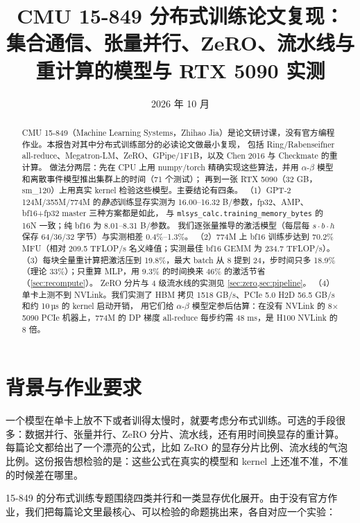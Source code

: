 \documentclass[11pt,a4paper]{ctexart}
\title{CMU 15-849 分布式训练论文复现：\\集合通信、张量并行、ZeRO、流水线与重计算的模型与 RTX 5090 实测}
\author{\authorline}
\date{2026 年 10 月}
\begin{document}
\maketitle

\begin{abstract}
CMU 15-849（Machine Learning Systems，Zhihao Jia）是论文研讨课，没有官方编程作业。本报告对其中分布式训练部分的必读论文做最小复现，
包括 Ring/Rabenseifner all-reduce、Megatron-LM、ZeRO、GPipe/1F1B，以及 Chen 2016 与 Checkmate 的重计算。
做法分两层：先在 CPU 上用 numpy/torch 精确实现这些算法，并用 $\alpha$-$\beta$ 模型和离散事件模型推出集群上的时间（71 个测试）；
再到一张 RTX 5090（32 GB，sm\_120）上用真实 kernel 检验这些模型。主要结论有四条。
（1）GPT-2 124M/355M/774M 的\emph{静态}训练显存实测为 16.00--16.32 B/参数，fp32、AMP、bf16+fp32 master 三种方案都是如此，
与 \texttt{mlsys\_calc.training\_memory\_bytes} 的 16N 一致；纯 bf16 为 8.01--8.31 B/参数。
我们逐张量推导的激活模型（每层每 $s\cdot b\cdot h$ 保存 64/36/32 字节）与实测相差 0.4\%--1.3\%。
（2）774M 上 bf16 训练步达到 70.2\% MFU（相对 209.5 TFLOP/s 名义峰值；实测最佳 bf16 GEMM 为 234.7 TFLOP/s）。
（3）每块全量重计算把激活压到 19.8\%，最大 batch 从 8 提到 24，步时间只多 18.9\%（理论 33\%）；只重算 MLP，用 9.3\% 的时间换来 46\% 的激活节省（\cref{sec:recompute}）。
ZeRO 分片与 4 级流水线的实测见 \cref{sec:zero,sec:pipeline}。
（4）单卡上测不到 NVLink。我们实测了 HBM 拷贝 1518 GB/s、PCIe 5.0 H2D 56.5 GB/s 和约 10\,µs 的 kernel 启动开销，
用它们给 $\alpha$-$\beta$ 模型定参后估算：在没有 NVLink 的 8$\times$5090 PCIe 机器上，774M 的 DP 梯度 all-reduce 每步约需 48 ms，是 H100 NVLink 的 8 倍。
\end{abstract}

\tableofcontents
\newpage

\section{背景与作业要求}
一个模型在单卡上放不下或者训得太慢时，就要考虑分布式训练。可选的手段很多：数据并行、张量并行、ZeRO 分片、流水线，还有用时间换显存的重计算。
每篇论文都给出了一个漂亮的公式，比如 ZeRO 的显存分片比例、流水线的气泡比例。这份报告想检验的是：这些公式在真实的模型和 kernel 上还准不准，不准的时候差在哪里。

15-849 的分布式训练专题围绕四类并行和一类显存优化展开。由于没有官方作业，我们把每篇论文里最核心、可以检验的命题挑出来，各自对应一个实验：
\end{document}
